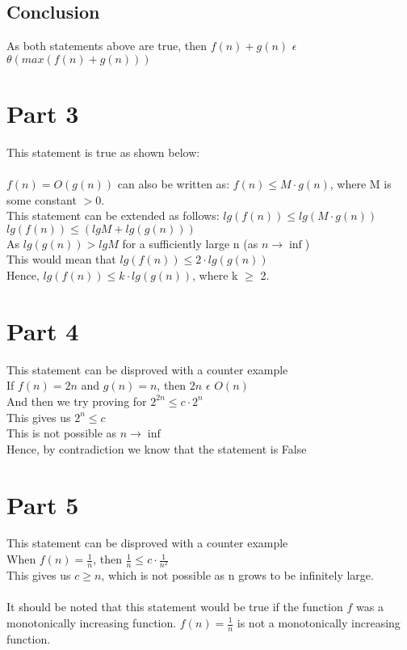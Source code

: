 \documentclass[]{article}
\begin{document}
\subsection{Conclusion}
As both statements above are true, then $ f(n) + g(n) $ $\epsilon $ $ \theta (max(f(n) + g(n)))$


\section{Part 3}
This statement is true as shown below: \\ \\
$f(n) = O(g(n))$ can also be written as: $f(n) \leq M \cdot g(n)$, where M is some constant $> 0$. \\
This statement can be extended as follows:
$lg(f(n)) \leq lg(M \cdot g(n))$ \\
$ lg (f(n)) \leq (lg M + lg(g(n)))  $ \\
As $lg(g(n)) > lg M $ for a sufficiently large n (as $n \rightarrow \inf$) \\
This would mean that $lg (f(n)) \leq 2 \cdot lg(g(n)) $ \\
Hence, $ lg(f(n)) \leq k \cdot lg(g(n))$, where k $ \geq $ 2.


\section{Part 4}
This statement can be disproved with a counter example \\
If $f(n) = 2n$ and $g(n) = n$, then $2n$ $\epsilon$ $O(n)$ \\
And then we try proving for $2^{2n} \leq c \cdot 2^n$ \\
This gives us $2^n \leq c$ \\
This is not possible as $ n \rightarrow \inf $ \\
Hence, by contradiction we know that the statement is False

\section{Part 5}
This statement can be disproved with a counter example \\
When $ f(n) = \frac{1}{n}$, then $ \frac{1}{n} \leq c \cdot \frac{1}{n^2} $ \\
This gives us $ c \geq n$, which is not possible as n grows to be infinitely large. \\ \\
It should be noted that this statement would be true if the function $f$ was a monotonically increasing function. $f(n) = \frac{1}{n} $ is not a monotonically increasing function.
\end{document}
